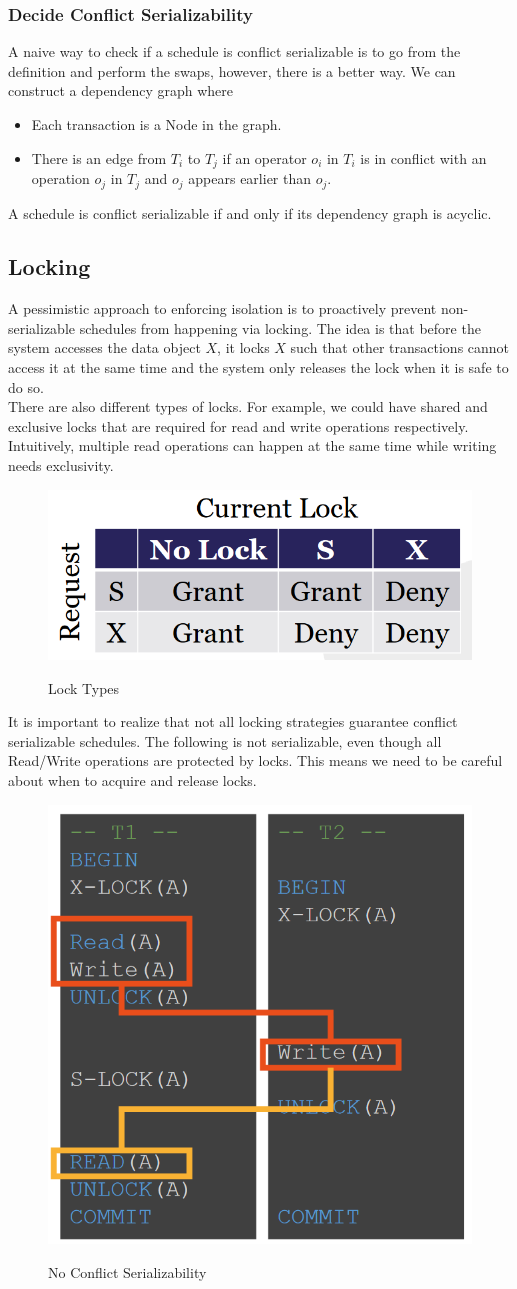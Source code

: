 \subsubsection{Decide Conflict Serializability}
A naive way to check if a schedule is conflict serializable is to go from the definition and perform the swaps, however, there is a better way. We can construct a dependency graph where
\begin{itemize}
\item Each transaction is a Node in the graph.
\item There is an edge from $T_i$ to $T_j$ if an operator $o_i$ in $T_i$ is in conflict with an operation $o_j$ in $T_j$ and $o_j$ appears earlier than $o_j$.
\end{itemize}
A schedule is conflict serializable if and only if its dependency graph is acyclic.

\subsection{Locking}
A pessimistic approach to enforcing isolation is to proactively prevent non-serializable schedules from happening via locking. The idea is that before the system accesses the data object $X$, it locks $X$ such that other transactions cannot access it at the same time and the system only releases the lock when it is safe to do so.\\
There are also different types of locks. For example, we could have shared and exclusive locks that are required for read and write operations respectively. Intuitively, multiple read operations can happen at the same time while writing needs exclusivity.
\begin{figure}[H]
\centering
\includegraphics[width=.5\textwidth]{images/lock_types.PNG}
\label{lock_types}
\caption{Lock Types}
\end{figure}
It is important to realize that not all locking strategies guarantee conflict serializable schedules. The following is not serializable, even though all Read/Write operations are protected by locks. This means we need to be careful about when to acquire and release locks.
\begin{figure}[H]
\centering
\includegraphics[width=.4\textwidth]{images/lock_strategies.PNG}
\label{lock_strategies}
\caption{No Conflict Serializability}
\end{figure}

